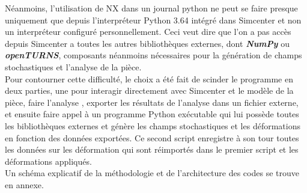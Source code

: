 \documentclass[a4paper,10pt]{article}
\begin{document}
Néanmoins, l'utilisation de NX dans un journal python ne peut se faire presque uniquement que depuis l’interpréteur Python 3.64 intégré dans Simcenter et non un interpréteur configuré personnellement. Ceci veut dire que l'on a pas accès depuis Simcenter a toutes les autres bibliothèques externes, dont \textit{\textbf{NumPy}} ou \textit{\textbf{openTURNS}}, composants néanmoins nécessaires pour la génération de champs stochastiques et l'analyse de la pièce. \\

Pour contourner cette difficulté, le choix a été fait de scinder le programme en deux parties, une pour interagir directement avec Simcenter et le modèle de la pièce, faire l'analyse , exporter les résultats de l'analyse dans un fichier externe, et ensuite faire appel à un programme Python exécutable qui lui possède toutes les bibliothèques externes et génère les champs stochastiques et les déformations en fonction des données exportées. Ce second script enregistre à son tour toutes les données sur les déformation qui sont réimportés dans le premier script et les déformations appliqués. \\

Un schéma explicatif de la méthodologie et de l'architecture des codes se trouve en annexe. \\
\end{document}
